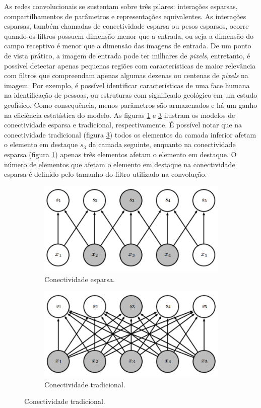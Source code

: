 As redes convolucionais se sustentam sobre três pilares: interações esparsas, compartilhamentos
de parâmetros e representações equivalentes. 
As interações esparsas, também chamadas de conectividade esparsa ou pesos esparsos,
ocorre quando os filtros possuem  dimensão menor que a entrada, ou seja a
dimensão do campo receptivo é menor que a dimensão das imagens de entrada.
De um ponto de vista prático, a imagem de entrada pode ter milhares de \textit{pixels}, entretanto, é 
possível detectar apenas pequenas regiões com características de maior relevância
com filtros que compreendam apenas algumas dezenas ou centenas de \textit{pixels} na imagem.
Por exemplo, é possível identificar características de uma face humana na identificação de pessoas, ou estruturas com
significado geológico em um estudo geofísico. Como consequência,
menos parâmetros são armazenados e há um ganho na eficiência estatística do
modelo. As figuras \ref{fig:sparse} e \ref{fig:full} ilustram
os modelos de conectividade esparsa e tradicional, respectivamente.
É possível notar que na conectividade tradicional (figura \ref{fig:full}) todos os elementos da camada inferior
afetam o elemento em destaque $s_3$ da camada seguinte, enquanto na conectividade esparsa (figura \ref{fig:sparse}) apenas
três elementos afetam o elemento em destaque. O número de elementos que afetam o elemento em destaque na
conectividade esparsa é definido pelo tamanho do filtro utilizado na convolução.

\begin{figure}[htp]
\begin{subfigure}{.5\textwidth}
  \centering
  \includegraphics[width=.9\linewidth]{fig/sparse}
  \caption{Conectividade esparsa.}
  \label{fig:sparse}
\end{subfigure}
\begin{subfigure}{.5\textwidth}
  \centering
  \includegraphics[width=.9\linewidth]{fig/full}
  \caption{Conectividade tradicional.}
  \label{fig:full}
\end{subfigure}%
\end{figure}

